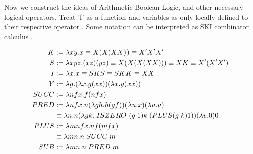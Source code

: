 Now we construct the ideas of Arithmetic Boolean Logic, and other necessary logical operators.
Treat 'f' as a function and variables as only locally defined to their respective operator \cite{LambdaFuncsList}.
Some notation can be interpreted as SKI combinator calculus \cite{SKICalcWiki}.


\[
    \begin{aligned}
        K &:= \lambda xy. x \equiv X(X (X X)) \equiv X' X' X'\\
        S &:= \lambda xyz. (x z) (y z) \equiv X (X (X (X X))) \equiv X K \equiv X' (X' X')\\
        I &:= \lambda x. x \equiv S K S \equiv S K K \equiv X X\\
        Y &:= \lambda g. (\lambda x. g (x x)) (\lambda x. g (x x))\\
        SUCC &:= \lambda nfx. f (n f x)\\
        PRED &:= \lambda n fx. n (\lambda gh. h(g f)) (\lambda u. x) (\lambda u. u)\\
            &\equiv \lambda n. n (\lambda gk. \hspace{0.1cm} ISZERO \hspace{0.1cm} (g \hspace{0.1cm} 1) k \hspace{0.1cm} (PLUS (g \hspace{0.1cm}k) 1))  (\lambda v. 0) 0\\
        PLUS &:= \lambda mnfx. n f (m f x)\\
            &\equiv \lambda mn. n \hspace{0.1cm} SUCC \hspace{0.1cm} m\\
        SUB &:= \lambda mn. n \hspace{0.1cm} PRED \hspace{0.1cm} m\\
    \end{aligned}
\]
